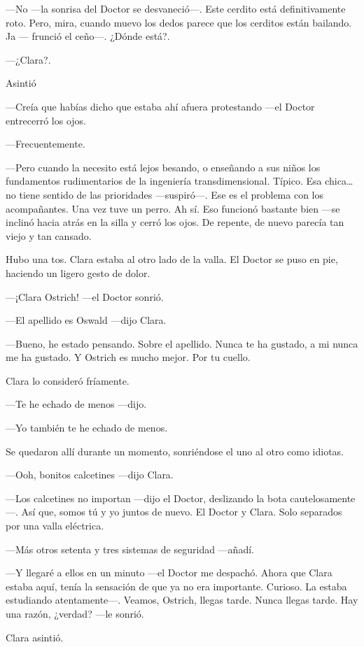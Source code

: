 ---No ---la sonrisa del Doctor se desvaneció---. Este cerdito está
definitivamente roto. Pero, mira, cuando muevo los dedos parece que los
cerditos están bailando. Ja --- frunció el ceño---. ¿Dónde está?.

---¿Clara?.

Asintió

---Creía que habías dicho que estaba ahí afuera protestando ---el Doctor
entrecerró los ojos.

---Frecuentemente.

---Pero cuando la necesito está lejos besando, o enseñando a sus niños
los fundamentos rudimentarios de la ingeniería transdimensional. Típico.
Esa chica\ldots{} no tiene sentido de las prioridades ---suspiró---. Ese
es el problema con los acompañantes. Una vez tuve un perro. Ah sí. Eso
funcionó bastante bien ---se inclinó hacia atrás en la silla y cerró los
ojos. De repente, de nuevo parecía tan viejo y tan cansado.

Hubo una tos. Clara estaba al otro lado de la valla. El Doctor se puso
en pie, haciendo un ligero gesto de dolor.

---¡Clara Ostrich! ---el Doctor sonrió.

---El apellido es Oswald ---dijo Clara.

---Bueno, he estado pensando. Sobre el apellido. Nunca te ha gustado, a
mi nunca me ha gustado. Y Ostrich es mucho mejor. Por tu cuello.

Clara lo consideró fríamente.

---Te he echado de menos ---dijo.

---Yo también te he echado de menos.

Se quedaron allí durante un momento, sonriéndose el uno al otro como
idiotas.

---Ooh, bonitos calcetines ---dijo Clara.

---Los calcetines no importan ---dijo el Doctor, deslizando la bota
cautelosamente---. Así que, somos tú y yo juntos de nuevo. El Doctor y
Clara. Solo separados por una valla eléctrica.

---Más otros setenta y tres sistemas de seguridad ---añadí.

---Y llegaré a ellos en un minuto ---el Doctor me despachó. Ahora que
Clara estaba aquí, tenía la sensación de que ya no era importante.
Curioso. La estaba estudiando atentamente---. Veamos, Ostrich, llegas
tarde. Nunca llegas tarde. Hay una razón, ¿verdad? ---le sonrió.

Clara asintió.

